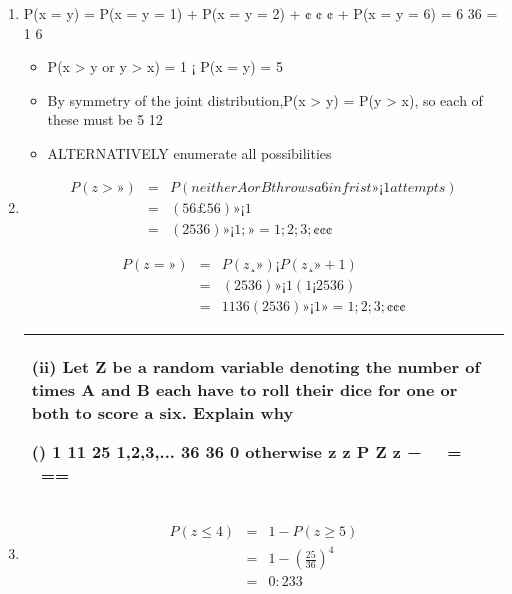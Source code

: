 \documentclass[a4paper,12pt]{article}
\begin{document}
\begin{enumerate}
    \item 
P(x = y) = P(x = y = 1) + P(x = y = 2) + ¢ ¢ ¢ + P(x = y = 6) = 6
36 = 1
6
\begin{itemize}
    \item P(x > y or y > x) = 1 ¡ P(x = y) = 5
\item By symmetry of the joint distribution,P(x > y) = P(y > x), so each of these must be
5
12
\item ALTERNATIVELY enumerate all possibilities
\end{itemize}

\item 
\begin{eqnarray*}
P(z > ») &=& P(neither A or B throws a 6 in frist » ¡ 1 attempts)\\
&=& ( 5
6 £ 5
6 )»¡1 \\
&=& ( 25
36 )»¡1; » = 1; 2; 3; ¢ ¢ ¢
\end{eqnarray*}

\begin{eqnarray*}
P(z = ») &=& P(z ¸ ») ¡ P(z ¸ » + 1)\\
&=& ( 25
36 )»¡1(1 ¡ 25
36 ) \\
&=& 11
36 ( 25
36 )»¡1 » = 1; 2; 3; ¢ ¢ ¢
\end{eqnarray*}

    
  \begin{table}[ht!]
     \centering
     \begin{tabular}{|p{15cm}|}
     \hline  
(ii) Let Z be a random variable denoting the number of times A and B each have to roll their dice for one or both to score a six.  Explain why 
 
 ()
1
11 25
1,2,3,...
36 36
0 otherwise
z
z
P Z z
−  =  ==   
 
 \\ \hline 
      \end{tabular}
    \end{table}
    
    
     

    
    
\item 
\begin{eqnarray*}
P(z \leq 4) &=& 1 - P(z \geq 5) \\
&=& 1 - \left(
 \frac{25}{
36} \right
)^4 \\
&=&  0:233
\end{eqnarray*}



\end{enumerate}
\end{document}
